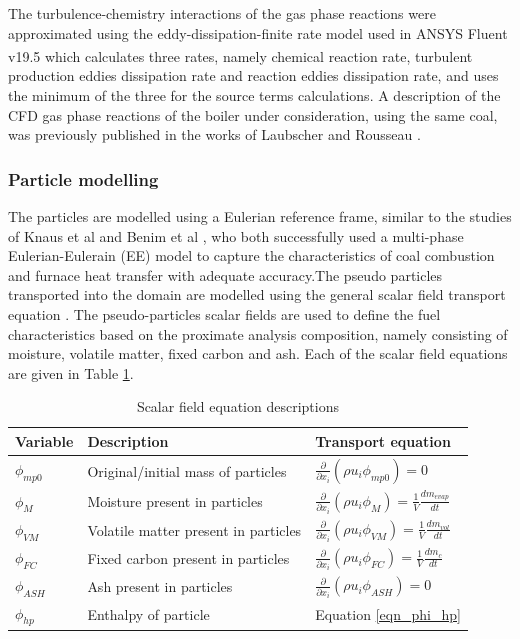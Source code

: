 \documentclass[review]{elsarticle}
\begin{document}
The turbulence-chemistry interactions of the gas phase reactions were approximated using the eddy-dissipation-finite rate model used in ANSYS Fluent v19.5\textsuperscript{\textregistered} which calculates three rates, namely chemical reaction rate, turbulent production eddies dissipation rate and reaction eddies dissipation rate, and uses the minimum of the three for the source terms calculations. A description of the CFD gas phase reactions of the boiler under consideration, using the same coal, was previously published in the works of Laubscher and Rousseau \cite{Laubscher2019b}.

\subsubsection{Particle modelling}
The particles are modelled using a Eulerian reference frame, similar to the studies of Knaus et al \cite{Knaus2001a} and Benim et al \cite{Benim2005}, who both successfully used a multi-phase Eulerian-Eulerain (EE) model to capture the characteristics of coal combustion and furnace heat transfer with adequate accuracy.The pseudo particles transported into the domain are modelled using the general scalar field transport equation \cite{Versteeg2007}. The pseudo-particles scalar fields are used to define the fuel characteristics based on the proximate analysis composition, namely consisting of moisture, volatile matter, fixed  carbon and ash. Each of the scalar field equations are given in Table \ref{tab_scalars}.

\begin{table}[h!]
\centering
\caption{Scalar field equation descriptions}\label{tab_scalars}       
\begin{tabular}{lll}
\hline
Variable &Description& Transport equation \\
\hline
$\phi_{mp0}$ &Original/initial mass of particles& $\frac{\partial}{\partial x_{i}}(\rho u_{i} \phi_{mp0})=0$\\
$\phi_{M}$&Moisture present in particles&$\frac{\partial}{\partial x_{i}}(\rho u_{i} \phi_{M})=\frac{1}{V} \frac{dm_{evap}}{dt}$\\
$\phi_{VM}$&Volatile matter present in particles&  $\frac{\partial}{\partial x_{i}}(\rho u_{i} \phi_{VM})=\frac{1}{V}\frac{dm_{vol}}{dt}$\\
$\phi_{FC}$&Fixed carbon present in particles&$\frac{\partial}{\partial x_{i}}(\rho u_{i} \phi_{FC})=\frac{1}{V}\frac{dm_c}{dt}$\\
$\phi_{ASH}$&Ash present in particles&$\frac{\partial}{\partial x_{i}}(\rho u_{i} \phi_{ASH})=0$\\
$\phi_{hp}$&Enthalpy of particle&Equation \eqref{eqn_phi_hp}\\
\hline
\end{tabular}
\end{table}
\end{document}
